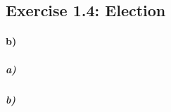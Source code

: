 \documentclass[12pt,a4paper]{article}
\begin{document}
\subsection*{Exercise 1.4: Election}
\paragraph{b)} %
	\subparagraph{a)} %
	\subparagraph{b)} %
\end{document}

